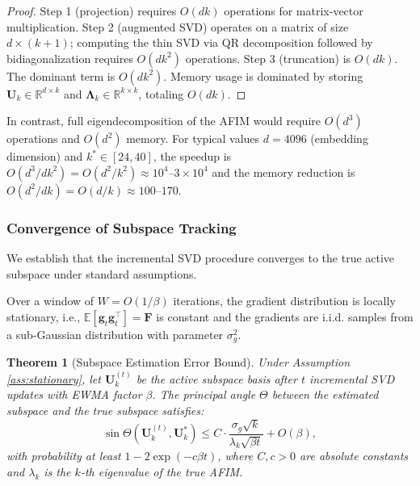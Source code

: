 \documentclass[preprint,12pt]{elsarticle}
\newtheorem{theorem}{Theorem}[section]
\begin{document}
\begin{proof}
Step 1 (projection) requires $O(dk)$ operations for matrix-vector multiplication. Step 2 (augmented SVD) operates on a matrix of size $d \times (k+1)$; computing the thin SVD via QR decomposition followed by bidiagonalization requires $O(dk^2)$ operations. Step 3 (truncation) is $O(dk)$. The dominant term is $O(dk^2)$. Memory usage is dominated by storing $\mathbf{U}_k \in \mathbb{R}^{d \times k}$ and $\boldsymbol{\Lambda}_k \in \mathbb{R}^{k \times k}$, totaling $O(dk)$.
\end{proof}

In contrast, full eigendecomposition of the AFIM would require $O(d^3)$ operations and $O(d^2)$ memory. For typical values $d = 4096$ (embedding dimension) and $k^* \in [24, 40]$, the speedup is $O(d^3 / dk^2) = O(d^2/k^2) \approx 10^4\text{--}3 \times 10^4$ and the memory reduction is $O(d^2 / dk) = O(d/k) \approx 100\text{--}170$.

\subsubsection{Convergence of Subspace Tracking}
\label{sec:subspace_convergence}

We establish that the incremental SVD procedure converges to the true active subspace under standard assumptions.

\begin{assumption}
\label{ass:stationary}
Over a window of $W = O(1/\beta)$ iterations, the gradient distribution is locally stationary, i.e., $\mathbb{E}[\mathbf{g}_t \mathbf{g}_t^\top] = \mathbf{F}$ is constant and the gradients are i.i.d. samples from a sub-Gaussian distribution with parameter $\sigma_g^2$.
\end{assumption}

\begin{theorem}[Subspace Estimation Error Bound]
\label{thm:subspace_error}
Under Assumption \ref{ass:stationary}, let $\mathbf{U}_k^{(t)}$ be the active subspace basis after $t$ incremental SVD updates with EWMA factor $\beta$. The principal angle $\Theta$ between the estimated subspace and the true subspace satisfies:
\begin{equation}
\label{eq:subspace_error}
\sin \Theta\left(\mathbf{U}_k^{(t)}, \mathbf{U}_k^*\right) \leq C \cdot \frac{\sigma_g \sqrt{k}}{\lambda_k \sqrt{\beta t}} + O(\beta),
\end{equation}
with probability at least $1 - 2\exp(-c \beta t)$, where $C, c > 0$ are absolute constants and $\lambda_k$ is the $k$-th eigenvalue of the true AFIM.
\end{theorem}
\end{document}
